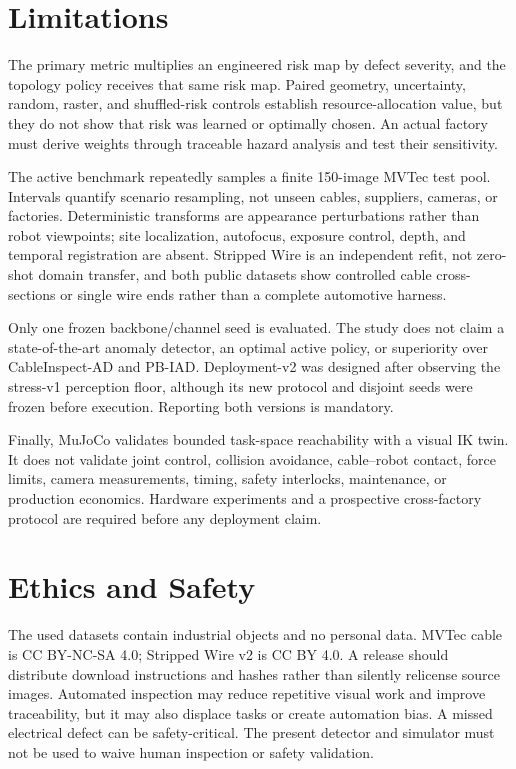 \documentclass[journal]{IEEEtran}
\begin{document}
\section{Limitations}

The primary metric multiplies an engineered risk map by defect severity, and
the topology policy receives that same risk map.  Paired geometry, uncertainty,
random, raster, and shuffled-risk controls establish resource-allocation value,
but they do not show that risk was learned or optimally chosen.  An actual
factory must derive weights through traceable hazard analysis and test their
sensitivity.

The active benchmark repeatedly samples a finite 150-image MVTec test pool.
Intervals quantify scenario resampling, not unseen cables, suppliers, cameras,
or factories.  Deterministic transforms are appearance perturbations rather
than robot viewpoints; site localization, autofocus, exposure control, depth,
and temporal registration are absent.  Stripped Wire is an independent refit,
not zero-shot domain transfer, and both public datasets show controlled cable
cross-sections or single wire ends rather than a complete automotive harness.

Only one frozen backbone/channel seed is evaluated.  The study does not claim a
state-of-the-art anomaly detector, an optimal active policy, or superiority over
CableInspect-AD and PB-IAD.  Deployment-v2 was designed after observing the
stress-v1 perception floor, although its new protocol and disjoint seeds were
frozen before execution.  Reporting both versions is mandatory.

Finally, MuJoCo validates bounded task-space reachability with a visual IK twin.
It does not validate joint control, collision avoidance, cable--robot contact,
force limits, camera measurements, timing, safety interlocks, maintenance, or
production economics.  Hardware experiments and a prospective cross-factory
protocol are required before any deployment claim.

\section{Ethics and Safety}

The used datasets contain industrial objects and no personal data.  MVTec cable
is CC BY-NC-SA 4.0; Stripped Wire v2 is CC BY 4.0.  A release should distribute
download instructions and hashes rather than silently relicense source images.
Automated inspection may reduce repetitive visual work and improve traceability,
but it may also displace tasks or create automation bias.  A missed electrical
defect can be safety-critical.  The present detector and simulator must not be
used to waive human inspection or safety validation.
\end{document}
